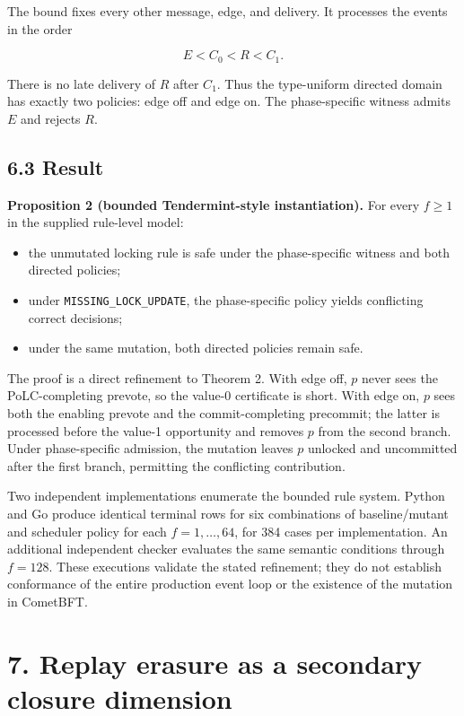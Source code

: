 \documentclass[10pt,a4paper]{article}
\newcommand{\tightlist}{\setlength{\itemsep}{0pt}\setlength{\parskip}{0pt}}
\begin{document}
The bound fixes every other message, edge, and delivery. It processes
the events in the order

\[
E < C_0 < R < C_1.
\]

There is no late delivery of \(R\) after \(C_1\). Thus the type-uniform
directed domain has exactly two policies: edge off and edge on. The
phase-specific witness admits \(E\) and rejects \(R\).

\subsection{6.3 Result}\label{result}

\textbf{Proposition 2 (bounded Tendermint-style instantiation).} For
every \(f\geq1\) in the supplied rule-level model:

\begin{itemize}
\tightlist
\item
  the unmutated locking rule is safe under the phase-specific witness
  and both directed policies;
\item
  under \texttt{MISSING\_LOCK\_UPDATE}, the phase-specific policy yields
  conflicting correct decisions;
\item
  under the same mutation, both directed policies remain safe.
\end{itemize}

The proof is a direct refinement to Theorem 2. With edge off, \(p\)
never sees the PoLC-completing prevote, so the value-0 certificate is
short. With edge on, \(p\) sees both the enabling prevote and the
commit-completing precommit; the latter is processed before the value-1
opportunity and removes \(p\) from the second branch. Under
phase-specific admission, the mutation leaves \(p\) unlocked and
uncommitted after the first branch, permitting the conflicting
contribution.

Two independent implementations enumerate the bounded rule system.
Python and Go produce identical terminal rows for six combinations of
baseline/mutant and scheduler policy for each \(f=1,\ldots,64\), for 384
cases per implementation. An additional independent checker evaluates
the same semantic conditions through \(f=128\). These executions
validate the stated refinement; they do not establish conformance of the
entire production event loop or the existence of the mutation in
CometBFT.

\section{7. Replay erasure as a secondary closure
dimension}\label{replay-erasure-as-a-secondary-closure-dimension}
\end{document}
